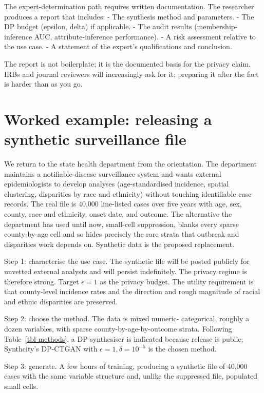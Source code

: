 \documentclass[
  letterpaper,
  11pt]{scrbook}
\begin{document}
The expert-determination path requires written documentation. The
researcher produces a report that includes: - The synthesis method and
parameters. - The DP budget (epsilon, delta) if applicable. - The audit
results (membership-inference AUC, attribute-inference performance). - A
risk assessment relative to the use case. - A statement of the expert's
qualifications and conclusion.

The report is not boilerplate; it is the documented basis for the
privacy claim. IRBs and journal reviewers will increasingly ask for it;
preparing it after the fact is harder than as you go.

\section{Worked example: releasing a synthetic surveillance
file}\label{worked-example-releasing-a-synthetic-surveillance-file}

We return to the state health department from the orientation. The
department maintains a notifiable-disease surveillance system and wants
external epidemiologists to develop analyses (age-standardised
incidence, spatial clustering, disparities by race and ethnicity)
without touching identifiable case records. The real file is 40,000
line-listed cases over five years with age, sex, county, race and
ethnicity, onset date, and outcome. The alternative the department has
used until now, small-cell suppression, blanks every sparse
county-by-age cell and so hides precisely the rare strata that outbreak
and disparities work depends on. Synthetic data is the proposed
replacement.

Step 1: characterise the use case. The synthetic file will be posted
publicly for unvetted external analysts and will persist indefinitely.
The privacy regime is therefore strong. Target \(\epsilon = 1\) as the
privacy budget. The utility requirement is that county-level incidence
rates and the direction and rough magnitude of racial and ethnic
disparities are preserved.

Step 2: choose the method. The data is mixed numeric- categorical,
roughly a dozen variables, with sparse county-by-age-by-outcome strata.
Following Table~\ref{tbl-methods}, a DP-synthesiser is indicated because
release is public; Synthcity's DP-CTGAN with
\(\epsilon = 1, \delta = 10^{-5}\) is the chosen method.

Step 3: generate. A few hours of training, producing a synthetic file of
40,000 cases with the same variable structure and, unlike the suppressed
file, populated small cells.
\end{document}
